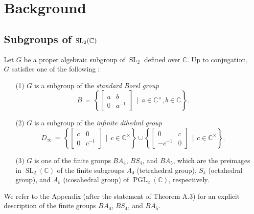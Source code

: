 \documentclass[reqno]{amsart}
\theoremstyle{plain}
\theoremstyle{definition}
\theoremstyle{remark}
\newcommand{\C}{{\mathbb{C}}}
\DeclareMathOperator{\PGL}{PGL}
\DeclareMathOperator{\SL}{SL}
\begin{document}
\section{Background} \label{sect:2}
\subsection{Subgroups of ${\rm SL}_2(\C)$} \label{sect:2.1}
Let $G$ be a proper algebraic subgroup of $\SL_2$ defined over $\C$. Up to conjugation, $G$ satisfies one of the
following \cite[Theorem 4.29]{vs}:
\begin{enumerate}
	\item[\textup{(1)}] $G$ is a subgroup of the \emph{standard Borel group}
	$$B\,=\,\left\{\begin{bmatrix}a & b\\ 0 & a^{-1}\end{bmatrix}\,\mid\, a\in\C^\times,b\in\C\right\}.$$
	\item[\textup{(2)}] $G$ is a subgroup of the \emph{infinite dihedral group}
	$$D_\infty\,=\,\left\{\begin{bmatrix}c & 0 \\ 0 & c^{-1}\end{bmatrix}\,\mid\,c\in\C^\times\right\}\cup \left\{\begin{bmatrix}0 & c \\ -c^{-1} & 0\end{bmatrix}\,\mid\,c\in\C^\times\right\}.$$
	\item[\textup{(3)}] $G$ is one of the finite groups $B A_4$, $B S_4$, and $B A_5$, which are the preimages in $\SL_2(\C)$ of the finite subgroups $A_4$ (tetrahedral group), $S_4$ (octahedral group), and $A_5$ (icosahedral group) of $\PGL_2(\C)$, respectively.
\end{enumerate}

We refer to the Appendix (after the statement of Theorem A.3) for an explicit description of the finite groups 
$B A_4$, $B S_4$, and $B A_5$.
\end{document}
